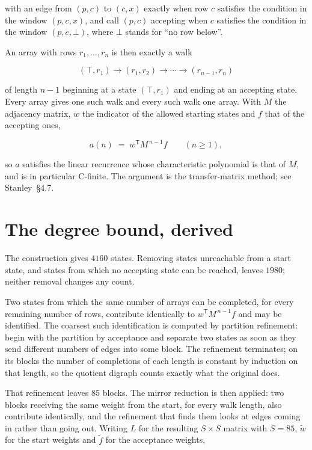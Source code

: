 \documentclass[11pt]{article}
\theoremstyle{definition}
\begin{document}
with an edge from $(p,c)$ to $(c,x)$ exactly when row $c$ satisfies the condition in the window $(p,c,x)$, and call $(p,c)$ accepting when $c$ satisfies the condition in the window $(p,c,\bot)$, where $\bot$ stands for ``no row below''.

An array with rows $r_1,\dots,r_n$ is then exactly a walk

\[(\top,r_1) \to (r_1,r_2) \to \cdots \to (r_{n-1},r_n)\]

of length $n-1$ beginning at a state $(\top,r_1)$ and ending at an accepting state. Every array gives one such walk and every such walk one array. With $M$ the adjacency matrix, $w$ the indicator of the allowed starting states and $f$ that of the accepting ones,

\[a(n) \;=\; w^{\mathsf T} M^{\,n-1} f \qquad (n \ge 1),\]

so $a$ satisfies the linear recurrence whose characteristic polynomial is that of $M$, and is in particular C-finite. The argument is the transfer-matrix method; see Stanley~\S4.7.

\section{The degree bound, derived}

The construction gives $4160$ states. Removing states unreachable from a start state, and states from which no accepting state can be reached, leaves $1980$; neither removal changes any count.

Two states from which the same number of arrays can be completed, for every remaining number of rows, contribute identically to $w^{\mathsf T}M^{\,n-1}f$ and may be identified. The coarsest such identification is computed by partition refinement: begin with the partition by acceptance and separate two states as soon as they send different numbers of edges into some block. The refinement terminates; on its blocks the number of completions of each length is constant by induction on that length, so the quotient digraph counts exactly what the original does.

That refinement leaves $85$ blocks. The mirror reduction is then applied: two blocks receiving the same weight from the start, for every walk length, also contribute identically, and the refinement that finds them looks at edges coming in rather than going out. Writing $L$ for the resulting $S \times S$ matrix with $S = 85$, $\tilde w$ for the start weights and $\tilde f$ for the acceptance weights,
\end{document}
